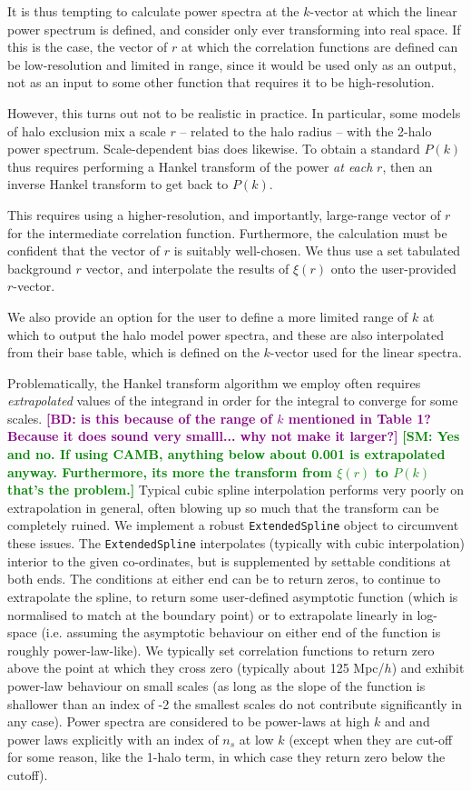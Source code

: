\documentclass[5p]{elsarticle}
\newcommand{\bd}[1]{\textcolor{purple}{\textbf{[BD: #1]}}}
\newcommand{\sgm}[1]{\textcolor{green}{\textbf{[SM: #1]}}}
\begin{document}
It is thus tempting to calculate power spectra at the $k$-vector at which the linear power spectrum is defined, and consider only ever transforming into real space. If this is the case, the vector of $r$ at which the correlation functions are defined can be low-resolution and limited in range, since it would be used only as an output, not as an input to some other function that requires it to be high-resolution.

However, this turns out not to be realistic in practice. 
In particular, some models of halo exclusion mix a scale $r$ -- related to the halo radius -- with the 2-halo power spectrum. Scale-dependent bias does likewise. To obtain a standard $P(k)$ thus requires performing a Hankel transform of the power \textit{at each} $r$, then an inverse Hankel transform to get back to $P(k)$. 

This requires using a higher-resolution, and importantly, large-range vector of $r$ for the intermediate correlation function. Furthermore, the calculation must be confident that the vector of $r$ is suitably well-chosen. We thus use a set tabulated background $r$ vector, and interpolate the results of $\xi(r)$ onto the user-provided $r$-vector. 

We also provide an option for the user to define a more limited range of $k$ at which to output the halo model power spectra, and these are also interpolated from their base table, which is defined on the $k$-vector used for the linear spectra. 

Problematically, the Hankel transform algorithm we employ often requires \textit{extrapolated} values of the integrand in order for the integral to converge for some scales. \bd{is this because of the range of $k$ mentioned in Table 1? Because it does sound very smalll... why not make it larger?} \sgm{Yes and no. If using CAMB, anything below about 0.001 is extrapolated anyway. Furthermore, its more the transform from $\xi(r)$ to $P(k)$ that's the problem.}
Typical cubic spline interpolation performs very poorly on extrapolation in general, often blowing up so much that the transform can be completely ruined.
We implement a robust \verb|ExtendedSpline| object to circumvent these issues. 
The \verb|ExtendedSpline| interpolates (typically with cubic interpolation) interior to the given co-ordinates, but is supplemented by settable conditions at both ends. 
The conditions at either end can be to return zeros, to continue to extrapolate the spline, to return some user-defined asymptotic function (which is normalised to match at the boundary point) or to extrapolate linearly in log-space (i.e. assuming the asymptotic behaviour on either end of the function is roughly power-law-like). 
We typically set correlation functions to return zero above the point at which they cross zero (typically about 125 Mpc/$h$) and exhibit power-law behaviour on small scales (as long as the slope of the function is shallower than an index of -2 the smallest scales do not contribute significantly in any case). 
Power spectra are considered to be power-laws at high $k$ and and power laws explicitly with an index of $n_s$ at low $k$ (except when they are cut-off for some reason, like the 1-halo term, in which case they return zero below the cutoff).
\end{document}
